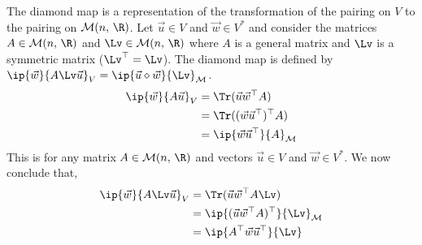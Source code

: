 \noindent
The diamond map is a representation of the transformation of the pairing on $V$ to the pairing on $\mathcal{M}(n,\,\R)$. Let $\vec u \in V$ and $\vec w \in V^*$ and consider the matrices $A \in \mathcal{M}(n,\,\R)$ and $\Lv \in \mathcal{M}(n,\,\R)$ where $A$ is a general matrix and $\Lv$ is a symmetric matrix ($\Lv^\top = \Lv$). The diamond map is defined by $\ip{\vec w}{A\Lv\vec u}_V = \ip{\vec u \diamond \vec w}{\Lv}_{\mathcal{M}}$.
\begin{align*}
  \ip{\vec w}{A\vec u}_V &= \Tr(\vec u \vec w^\top A) \\
  &= \Tr((\vec w \vec u ^\top)^\top A)\\
  &= \ip{\vec w\vec u^\top}{A}_{\mathcal{M}}
\end{align*}
This is for any matrix $A \in \mathcal{M}(n,\,\R)$ and vectors $\vec u \in V$ and $\vec w \in V^*$. We now conclude that,
\begin{align*}
  \ip{\vec w}{A\Lv \vec u}_V &= \Tr(\vec u \vec w^\top A\Lv) \\
  &= \ip{(\vec u\vec w^\top A)^\top}{\Lv}_{\mathcal{M}}\\
  &= \ip{A^\top\vec w\vec u^\top}{\Lv}
\end{align*}
